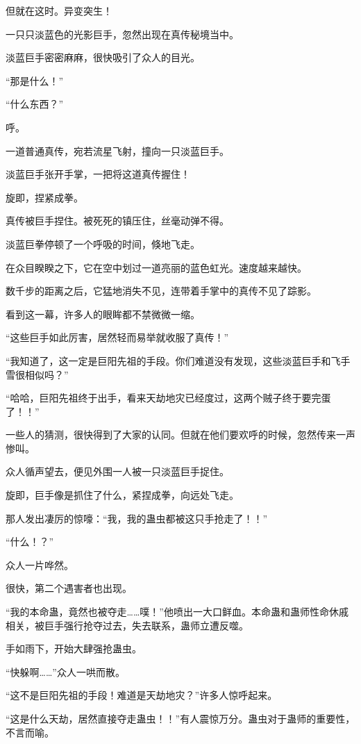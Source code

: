 \begin{this_body}
但就在这时。异变突生！

一只只淡蓝色的光影巨手，忽然出现在真传秘境当中。

淡蓝巨手密密麻麻，很快吸引了众人的目光。

“那是什么！”

“什么东西？”

呼。

一道普通真传，宛若流星飞射，撞向一只淡蓝巨手。

淡蓝巨手张开手掌，一把将这道真传握住！

旋即，捏紧成拳。

真传被巨手捏住。被死死的镇压住，丝毫动弹不得。

淡蓝巨拳停顿了一个呼吸的时间，倏地飞走。

在众目睽睽之下，它在空中划过一道亮丽的蓝色虹光。速度越来越快。

数千步的距离之后，它猛地消失不见，连带着手掌中的真传不见了踪影。

看到这一幕，许多人的眼眸都不禁微微一缩。

“这些巨手如此厉害，居然轻而易举就收服了真传！”

“我知道了，这一定是巨阳先祖的手段。你们难道没有发现，这些淡蓝巨手和飞手雪很相似吗？”

“哈哈，巨阳先祖终于出手，看来天劫地灾已经度过，这两个贼子终于要完蛋了！！”

一些人的猜测，很快得到了大家的认同。但就在他们要欢呼的时候，忽然传来一声惨叫。

众人循声望去，便见外围一人被一只淡蓝巨手捉住。

旋即，巨手像是抓住了什么，紧捏成拳，向远处飞走。

那人发出凄厉的惊嚎：“我，我的蛊虫都被这只手抢走了！！”

“什么！？”

众人一片哗然。

很快，第二个遇害者也出现。

“我的本命蛊，竟然也被夺走……噗！”他喷出一大口鲜血。本命蛊和蛊师性命休戚相关，被巨手强行抢夺过去，失去联系，蛊师立遭反噬。

手如雨下，开始大肆强抢蛊虫。

“快躲啊……”众人一哄而散。

“这不是巨阳先祖的手段！难道是天劫地灾？”许多人惊呼起来。

“这是什么天劫，居然直接夺走蛊虫！！”有人震惊万分。蛊虫对于蛊师的重要性，不言而喻。


\end{this_body}
